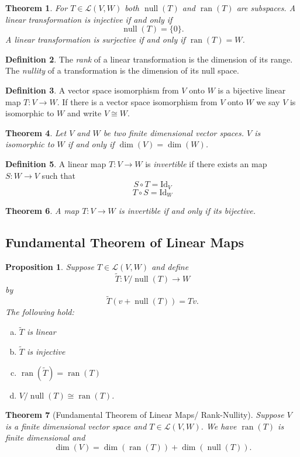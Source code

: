 \documentclass[12pt,letterpaper]{article}
\newcommand{\nul}{\operatorname {null}}
\newcommand{\ran}{\operatorname {ran}}
\theoremstyle{plain}
\newtheorem{theorem}{Theorem}[section]
\newtheorem{proposition}{Proposition}[section]
\theoremstyle{definition}
\newtheorem{definition}[theorem]{Definition}
\numberwithin{equation}{section}
\begin{document}
\begin{theorem} For $T\in \mathcal{L}(V,W)$ both $\nul(T)$ and $\ran(T)$ are subspaces. A linear transformation is injective if and only if 
\[\nul(T)=\{0\}.\]
A linear transformation is surjective if and only if $\ran(T)=W$. 
\end{theorem}
\begin{definition} The \emph{rank} of a linear transformation is the dimension of its range. The \emph{nullity} of a transformation is the dimension of its null space. 
\end{definition}

\begin{definition} A vector space isomorphism from $V$ onto $W$ is a bijective linear map $T:V\rightarrow W$. If there is a vector space isomorphism from $V$ onto $W$ we say $V$ is isomorphic to $W$ and write $V\cong W$. 
\end{definition}
\begin{theorem} Let $V$ and $W$ be two finite dimensional vector spaces. $V$ is isomorphic to $W$ if and only if $\dim(V)=\dim(W)$.
\end{theorem}
\begin{definition} A linear map $T:V\rightarrow W$ is \emph{invertible} if there exists an map $S:W\rightarrow V$ such that 
\[S\circ T=\text{Id}_{V}\]
\[T\circ S=\text{Id}_{W}\]
\end{definition}
\begin{theorem} A map $T:V\rightarrow W$ is invertible if and only if its bijective. 
\end{theorem}
\subsection{Fundamental Theorem of Linear Maps}
\begin{proposition} Suppose $T\in \mathcal{L}(V,W)$ and define 
\[\tilde{T}:V/\nul(T)\rightarrow W\] 
by
\[\tilde{T}(v+\nul(T))=Tv.\]
The following hold:
\begin{enumerate}[a)]
\item $\tilde{T}$ is linear
\item $\tilde{T}$ is injective
\item $\ran(\tilde{T})=\ran(T)$
\item $V/\nul(T)\cong \ran(T)$.
\end{enumerate}

\end{proposition}
\begin{theorem}[Fundamental Theorem of Linear Maps/ Rank-Nullity]
Suppose $V$ is a finite dimensional vector space and $T\in \mathcal{L}(V,W)$. We have $\ran(T)$ is finite dimensional and 
\[\dim(V)=\dim(\ran(T))+\dim(\nul(T)).\]
\end{theorem}
\end{document}
